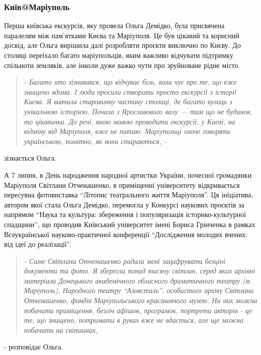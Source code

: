 \subsubsection{Київ@Маріуполь} 

Перша київська екскурсія, яку провела Ольга Демідко, була присвячена паралелям
між пам'ятками Києва та Маріуполя. Це був цікавий та корисний досвід, але Ольга
вирішила далі розробляти проєкти виключно по Києву. До столиці переїхало багато
маріупольців, яким важливо відчувати підтримку спільноти земляків, але інколи
дуже важко чути про зруйноване рідне місто.

\begin{quote}
\em
- Багато хто зізнавався, що відчуває біль, коли чує про те, що вже знищено
вдома. І люди просили створити просто екскурсії з історії Києва. Я вивчила
старовинну частину столиці, де багато вулиць з унікальною історією. Почала з
Ярославового валу — там що не будинок, то цікавинка. До речі, якою мовою
проводити екскурсії, у Києві, на відміну від Маріуполя, вже не питаю.
Маріупольці охоче говорять українською, помітно, як вони стараються, -
\end{quote}
зізнається Ольга.

А 7 липня, в День народження народної артистки України, почесної громадянки
Маріуполя Світлани Отченашенко, в приміщенні університету відкривається
пересувна фотовиставка \enquote{Літопис театрального життя Маріуполя}.  Ця ініціатива,
автором якої стала Ольга Демідко, перемогла у Конкурсі наукових проєктів за
напрямом \enquote{Наука та культура: збереження і популяризація історико-культурної
спадщини}, що проводив Київський університет імені Бориса Грінченка в рамках
Всеукраїнської науково-практичної конференції \enquote{Дослідження молодих вчених: від
ідеї до реалізації}.

\begin{quote}
\em
- Саме Світлана Отченашенко радила мені зацифрувати безціні документи та фото.
Я зберегла понад тисячу світлин, серед яких архівні матеріали Донецького
академічного обласного драматичного театру (м. Маріуполь), Народного театру
\enquote{Азовсталь}, особистого архіву Світлани Отченашенко, фондів Маріупольського
краєзнавчого музею. На них можна побачити приміщення, безліч афішок, програмок,
портрети акторів - це те, що знищено, потримати в руках вже не вдасться, але ще
можна побачити на світлинах, 
\end{quote}
- розповідає Ольга.


